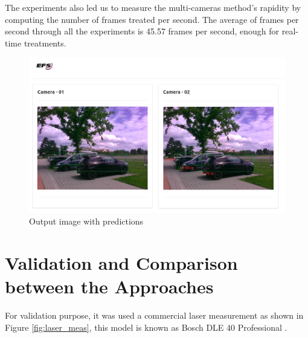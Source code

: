 The experiments also led us to measure the multi-cameras method's rapidity by computing the number of frames treated per second. The average of frames per second through all the experiments is 45.57 frames per second, enough for real-time treatments. 

\begin{figure}[H]
\centering
\includegraphics[scale=0.8]{imagens/output_framework.png}
\caption{Output image with predictions }
\label{fig:framework_predict}
\end{figure}



\section{Validation and Comparison between the Approaches}

For validation purpose, it was used a commercial laser measurement as shown in Figure \ref{fig:laser_meas}, this model is known as Bosch DLE 40 Professional {\tiny{\textregistered}}. 



